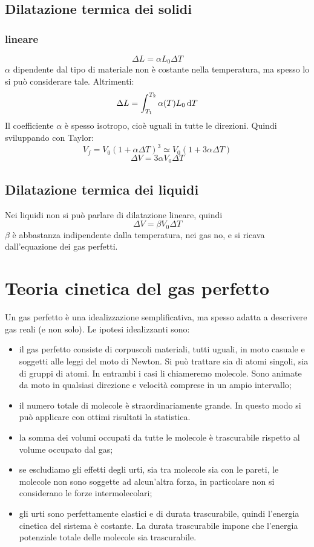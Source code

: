 \subsection{Dilatazione termica dei solidi}
\subsubsection{lineare}
\begin{equation}
   \Delta L=\alpha L_0\Delta T
\end{equation}
$\alpha$ dipendente dal tipo di materiale non è costante nella temperatura, ma spesso lo si può considerare tale. Altrimenti:
\begin{equation}
   \Delta L=\int_{T_1}^{T_2} \alpha(T) L_0 \,\mathrm{d} T
\end{equation}
Il coefficiente $\alpha$ è spesso isotropo, cioè uguali in tutte le direzioni. Quindi sviluppando con Taylor:
\[
   V_f = V_0(1+\alpha\Delta T)^3 \simeq V_0(1+3\alpha\Delta T)
\]
\begin{equation}
   \Delta V=3\alpha V_0\Delta T
\end{equation}
\subsection{Dilatazione termica dei liquidi}
Nei liquidi non si può parlare di dilatazione lineare, quindi
\begin{equation}
   \Delta V=\beta V_0\Delta T
\end{equation}
$\beta$ è abbastanza indipendente dalla temperatura, nei gas no, e si ricava dall'equazione dei gas perfetti.

\section{Teoria cinetica del gas perfetto}
\label{gas perfetto}
Un gas perfetto è una idealizzazione semplificativa, ma spesso adatta a descrivere gas reali (e non solo). Le ipotesi idealizzanti sono:
\begin{itemize}
   \item il gas perfetto consiste di corpuscoli materiali, tutti uguali, in moto casuale e soggetti alle leggi del moto di Newton. Si può trattare sia di atomi singoli, sia di gruppi di atomi. In entrambi i casi li chiameremo molecole. Sono animate da moto in qualsiasi direzione e velocità comprese in un ampio intervallo;
   \item il numero totale di molecole è straordinariamente grande. In questo modo si può applicare con ottimi risultati la statistica.
   \item la somma dei volumi occupati da tutte le molecole è trascurabile rispetto al volume occupato dal gas;
   \item se escludiamo gli effetti degli urti, sia tra molecole sia con le pareti, le molecole non sono soggette ad alcun'altra forza, in particolare non si considerano le forze intermolecolari;
   \item gli urti sono perfettamente elastici e di durata trascurabile, quindi l'energia cinetica del sistema è costante. La durata trascurabile impone che l'energia potenziale totale delle molecole sia trascurabile.
\end{itemize}

